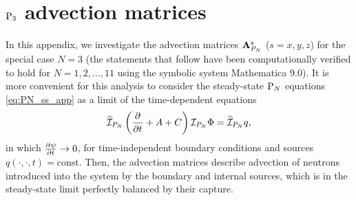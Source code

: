 \chapter{$\PN[3]$ advection matrices}\label{app:C}
In this appendix, we investigate the advection matrices $\mat{A}_{P_N}^s$ ($s = x,y,z$) for the special case $N = 3$ 
(the statements that follow have been computationally verified to hold for $N = 1,2,\ldots,11$ using the symbolic 
system Mathematica 9.0).
It is more convenient for this analysis to consider the steady-state $\PN$ equations \eqref{eq:PN_ss_app} as a limit
of the time-dependent equations
\begin{equation}\label{eq:PN_ss_app}
	\PihPN \left(\pd{}{t} + A + C\right) \PiPN\Phi = \PihPN q,
\end{equation}
in which $\pd{\psi}{t} \to 0$, for time-independent boundary conditions and sources
\linebreak[4]\mbox{$q(\cdot,\cdot,t) = \text{const}$}.
Then, the advection matrices describe advection of neutrons introduced into the system by the boundary and internal
sources, which is in the steady-state limit perfectly balanced by their capture.
